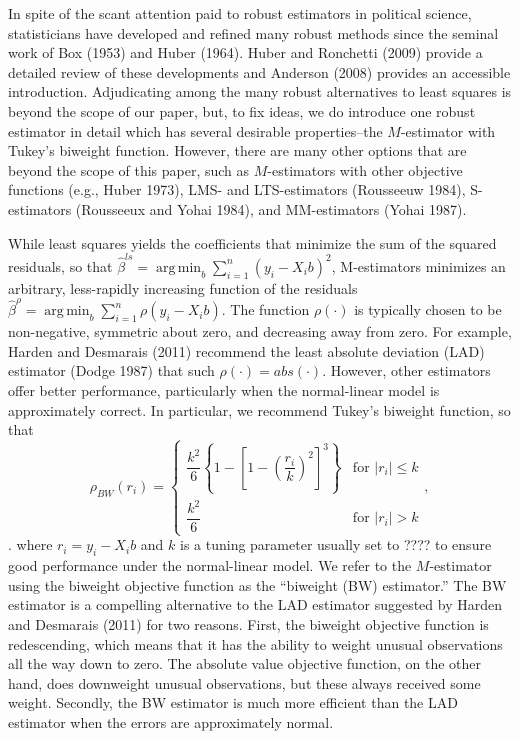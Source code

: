 \documentclass[12pt]{article}
\DeclareMathOperator*{\argmin}{arg\,min}
\begin{document}
In spite of the scant attention paid to robust estimators in political science, statisticians have developed and refined many robust methods since the seminal work of Box (1953) and Huber (1964). 
Huber and Ronchetti (2009) provide a detailed review of these developments and Anderson (2008) provides an accessible introduction. 
Adjudicating among the many robust alternatives to least squares is beyond the scope of our paper, but, to fix ideas, we do introduce one robust estimator in detail which has several desirable properties--the $M$-estimator with Tukey's biweight function. 
However, there are many other options that are beyond the scope of this paper, such as $M$-estimators with other objective functions (e.g., Huber 1973), LMS- and LTS-estimators (Rousseeuw 1984), S-estimators (Rousseeux and Yohai 1984), and MM-estimators (Yohai 1987).

While least squares yields the coefficients that minimize the sum of the squared residuals, so that $\hat{\beta}^{ls} =\argmin_{b} \sum_{i = 1}^n (y_i - X_ib)^2$, M-estimators minimizes an arbitrary, less-rapidly increasing function of the residuals $\hat{\beta}^{\rho} =\argmin_{b} \sum_{i = 1}^n \rho(y_i - X_ib)$. 
The function $\rho(\cdot)$ is typically chosen to be non-negative, symmetric about zero, and decreasing away from zero. 
For example, Harden and Desmarais (2011) recommend the least absolute deviation (LAD) estimator (Dodge 1987) that such $\rho(\cdot) = abs(\cdot)$. 
However, other estimators offer better performance, particularly when the normal-linear model is approximately correct. 
In particular, we recommend Tukey's biweight function, so that
\begin{displaymath}
   \rho_{BW}(r_i) = \left\{
     \begin{array}{lr}
       \dfrac{k^2}{6}\left\{ 1 - \left[ 1 - \left( \dfrac{r_i}{k} \right)^2 \right]^3\right\} & \text{for } |r_i| \leq k\\
        \dfrac{k^2}{6} & \text{for } |r_i| > k 
\end{array}
   \right.,
\end{displaymath}.
\noindent where $r_i = y_i - X_ib$ and $k$ is a tuning parameter usually set to ???? to ensure good performance under the normal-linear model. 
We refer to the $M$-estimator using the biweight objective function as the ``biweight (BW) estimator.'' 
The BW estimator is a compelling alternative to the LAD estimator suggested by Harden and Desmarais (2011) for two reasons. 
First, the biweight objective function is redescending, which means that it has the ability to weight unusual observations all the way down to zero. 
The absolute value objective function, on the other hand, does downweight unusual observations, but these always received some weight. 
Secondly, the BW estimator is much more efficient than the LAD estimator when the errors are approximately normal. 
\end{document}

